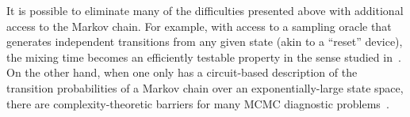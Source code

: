 It is possible to eliminate many of the difficulties presented above
with additional access to the Markov chain.
For example, with access to a sampling oracle that generates
independent transitions from any given state (akin to a ``reset''
device), the mixing time becomes an efficiently testable property in
the sense studied in~\citet{BaFoRuSmiWhi00,BaFoRuSmiWhi13}.
On the other hand, when one only has a circuit-based description of
the transition probabilities of a Markov chain over an
exponentially-large state space, there are complexity-theoretic
barriers for many MCMC diagnostic problems~\citet{BhaBoMo11}.
%
%
